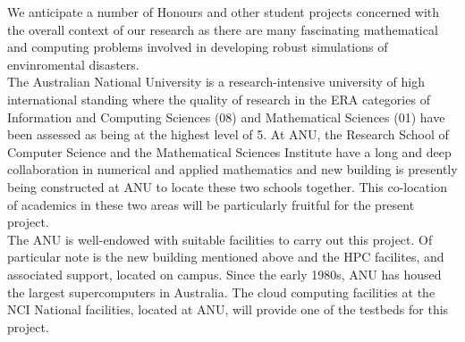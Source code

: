 
We anticipate a number of Honours and other student projects concerned with the overall context of our research as there are many 
fascinating mathematical and computing problems involved in developing robust simulations of envinromental disasters.\\

The Australian National University is a research-intensive university
of high international standing where the quality of research in the ERA categories of 
 Information and Computing
Sciences (08) and Mathematical Sciences (01) have been assessed as
being at the highest level of 5. At ANU, the Research School of
Computer Science and the Mathematical Sciences Institute have a long
and deep collaboration in numerical and applied mathematics and new building is presently being constructed at ANU to
locate these two schools together. This co-location of academics in these two
areas will be particularly fruitful for the present project.\\


The ANU is well-endowed with suitable facilities to carry out this project. Of particular note is the new building mentioned above and the HPC facilites, and associated support, located on campus.
Since the early 1980s, ANU has housed the
largest supercomputers in Australia. The cloud computing facilities at the NCI National
facilities, located at ANU, will provide one of the testbeds for this
project.




